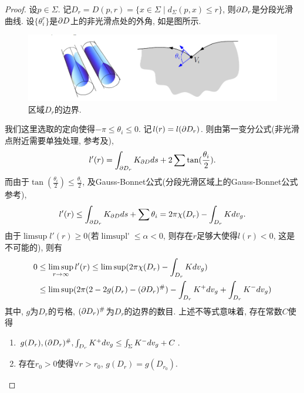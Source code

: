 \begin{proof}
    设$p \in \Sigma$. 记$D_r=D(p,r)=\{x\in \Sigma \mid d_\Sigma(p,x) \le r\}$, 则$\P D_r$是分段光滑曲线. 设$\{\theta^r_i\}$是$\P D$上的非光滑点处的外角, 如是图所示.
    \begin{figure}[ht]
        \centering
        \includegraphics[scale=0.8]{images/angle.png}
        \caption{区域$D_r$的边界.}
        \label{angle}
    \end{figure}
    我们这里选取的定向使得$-\pi \le \theta_i \le 0$.  记$l(r)=l(\P D_r)$. 则由第一变分公式(非光滑点附近需要单独处理, 参考\cite{White}及\cite{Perez}),
    \begin{equation}
        l'(r)=\int_{\P D_r}K_{\P D}ds+2\sum \tan(\frac{\theta_i}{2}).
    \end{equation}
    而由于$\tan(\frac{\theta_i}{2}) \le \frac{\theta_i}{2}$, 及Gauss-Bonnet公式(分段光滑区域上的Gauss-Bonnet公式参考\cite{lee}),
    \begin{equation}
        l'(r)\le \int_{\P D_r}K_{\P D}ds+\sum \theta_i = 2\pi\chi(D_r)-\int_{D_r}Kdv_g.
    \end{equation}
    由于$\mathop{\limsup} l'(r) \ge 0$(若$ \mathop{\limsup l'(r)} \le \alpha <0$, 则存在$r$足够大使得$l(r) < 0$, 这是不可能的), 则有
    \begin{equation} \label{basic_inequality}
        \begin{split}
            0 &\le \limsup_{r\to \infty} l'(r) \le \limsup(2\pi \chi(D_r) - \int_{D_r}Kdv_g) \\
            & \le \limsup (2\pi(2-2g(D_r)-(\P D_r)^\#)-\int_{D_r}K^+dv_g+\int_{D_r}K^-dv_g)
        \end{split}
    \end{equation}
    其中, $g$为$D_r$的亏格, $(\P D_r)^\#$为$D_r$的边界的数目. 上述不等式意味着, 存在常数$C$使得
    \begin{enumerate}
        \item $g(D_r), (\P D_r)^\#, \int_{D_r}K^+dv_g \le \int_\Sigma K^-dv_g +C$. \label{finite}
        \item 存在$r_0>0$使得$\forall r > r_0$, $g(D_r) = g(D_{r_0})$. \label{genus}
    \end{enumerate}

\end{proof}
